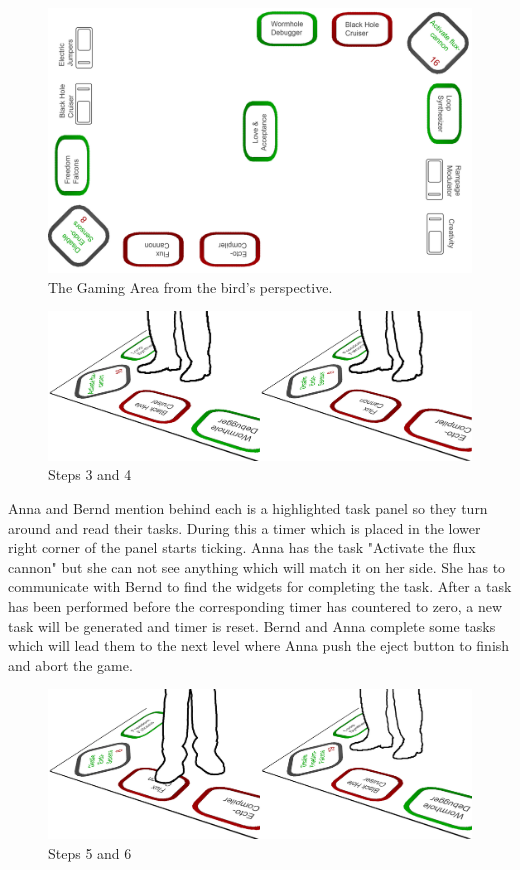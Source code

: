 \documentclass{sigchi}
\begin{document}
\begin{figure}[H]
\centering
\includegraphics[width=0.9\columnwidth]{walkthrough/gamingarea}
\caption{The Gaming Area from the bird's perspective.}
\label{fig:beamingArea}
\end{figure}
\vspace{2mm}



\begin{figure}[H]
\centering
\includegraphics[width=0.99\columnwidth]{walkthrough/klein/gamingarea3+4}
\caption{Steps 3 and 4}
\label{fig:gamingArea}
\end{figure}

Anna and Bernd mention behind each is a highlighted task panel so they turn around and read their tasks. During this a timer which is placed in the lower right corner of the panel starts ticking. Anna has the task "Activate the flux cannon" but she can not see anything which will match it on her side. She has to communicate with Bernd to find the widgets for completing the task. After a task has been performed before the corresponding timer has countered to zero, a new task will be generated and timer is reset. Bernd and Anna complete some tasks which will lead them to the next level where Anna push the eject button to finish and abort the game.

\begin{figure}[H]
\centering
\includegraphics[width=0.99\columnwidth]{walkthrough/klein/gamingarea5+6}
\caption{Steps 5 and 6}
\label{fig:gamingArea}
\end{figure}
\end{document}
